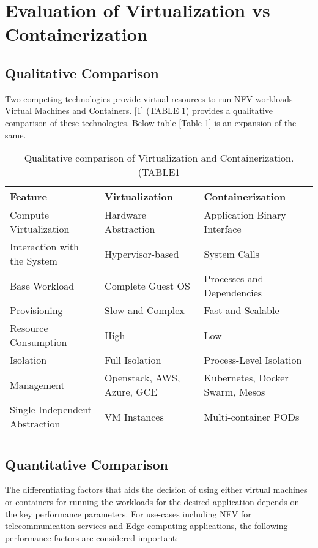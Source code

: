 \section{Evaluation of Virtualization vs Containerization}

\subsection{Qualitative Comparison}
	
\begin{flushleft}
Two competing technologies provide virtual resources to run NFV workloads – Virtual Machines and Containers. [1] (TABLE 1) provides a qualitative comparison of these technologies. Below table [Table 1] is an expansion of the same.

\begin{longtable}[t!]{|p{4cm}|p{4cm}|p{4cm}|}
	
\hline\hline
\textbf{Feature} & \textbf{Virtualization} & \textbf{Containerization} \\
\hline\hline
\hline
Compute Virtualization & Hardware Abstraction & Application Binary Interface \\
\hline
Interaction with the System & Hypervisor-based & System Calls \\
\hline
Base Workload & Complete Guest OS & Processes and Dependencies \\
\hline
Provisioning & Slow and Complex & Fast and Scalable \\
\hline
Resource Consumption & High & Low \\
\hline
Isolation & Full Isolation & Process-Level Isolation \\
\hline
Management & Openstack, AWS, Azure, GCE & Kubernetes, Docker Swarm, Mesos \\
\hline
Single Independent Abstraction & VM Instances & Multi-container PODs \\
\hline\hline
\hline
\label{tab:tab3}
\caption{Qualitative comparison of Virtualization and Containerization. (TABLE1 \cite[p.1663]{taleb17}}
\end{longtable}
	
\end{flushleft}

\subsection{Quantitative Comparison}

\begin{flushleft}
The differentiating factors that aids the decision of using either virtual machines or containers for running the workloads for the desired application depends on the key performance parameters. For use-cases including NFV for telecommunication services and Edge computing applications, the following performance factors are considered important:
\end{flushleft}

